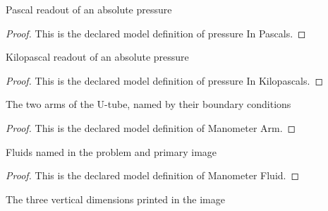 \begin{definition}
  \label{def:physics:phyx-mini-0388:phyxminiproblems-problemphyxmini0388-pressureinpascals}
  Pascal readout of an absolute pressure
\end{definition}
\begin{proof}
  This is the declared model definition of pressure In Pascals.
\end{proof}
\begin{definition}
  \label{def:physics:phyx-mini-0388:phyxminiproblems-problemphyxmini0388-pressureinkilopascals}
  Kilopascal readout of an absolute pressure
\end{definition}
\begin{proof}
  This is the declared model definition of pressure In Kilopascals.
\end{proof}
\begin{definition}
  \label{def:physics:phyx-mini-0388:phyxminiproblems-problemphyxmini0388-manometerarm}
  The two arms of the U-tube, named by their boundary conditions
\end{definition}
\begin{proof}
  This is the declared model definition of Manometer Arm.
\end{proof}
\begin{definition}
  \label{def:physics:phyx-mini-0388:phyxminiproblems-problemphyxmini0388-manometerfluid}
  Fluids named in the problem and primary image
\end{definition}
\begin{proof}
  This is the declared model definition of Manometer Fluid.
\end{proof}
\begin{definition}
  \label{def:physics:phyx-mini-0388:phyxminiproblems-problemphyxmini0388-figureheightlabel}
  The three vertical dimensions printed in the image
\end{definition}

